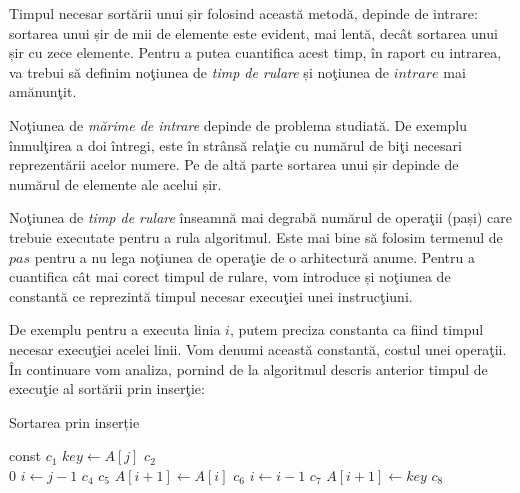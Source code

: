 Timpul necesar sortării unui șir folosind această metodă, depinde de intrare: sortarea unui șir de mii de elemente este evident, mai lentă, decât sortarea unui șir cu zece elemente. Pentru a putea cuantifica acest timp, în raport cu intrarea, va trebui să definim noţiunea de \textit{timp de rulare} și noţiunea de $intrare$ mai amănunţit.

Noţiunea de \textit{mărime de intrare} depinde de problema studiată. De exemplu înmulţirea a doi întregi, este în strânsă relaţie cu numărul de biţi necesari reprezentării acelor numere. Pe de altă parte sortarea unui șir depinde de numărul de elemente ale acelui șir.

Noţiunea de \textit{timp de rulare} înseamnă mai degrabă numărul de operaţii (pași) care trebuie executate pentru a rula algoritmul. Este mai bine să folosim termenul de $pas$ pentru a nu lega noţiunea de operaţie de o arhitectură anume. Pentru a cuantifica cât mai corect timpul de rulare, vom introduce și noţiunea de constantă ce reprezintă timpul necesar execuţiei unei instrucţiuni.

De exemplu pentru a executa linia $i$, putem preciza constanta ca fiind timpul necesar execuţiei acelei linii. Vom denumi această constantă, costul unei operaţii. În continuare vom analiza, pornind de la algoritmul descris anterior timpul de execuţie al sortării prin inserţie:
\begin{algorithm}
	\caption{Sortarea prin inserție}\label{alg:insertie}
	\begin{algorithmic}[1]
	
	 \hfill const  \tab{}
		  \hfill $c_1$  \tab{}
		\State $key\gets A[j]$ 		 	 \hfill $c_2$  \tab{} \\
		 \hfill $0$  \tab{}
		\State $i \gets j-1$ 			\hfill $c_4$  \tab{}
			\hfill $c_5$   \tab{}
		\State $A[i+1] \gets A[i]$ 				\hfill $c_6$   \tab{}
		\State $i \gets i-1$ 				\hfill $c_7$  		\tab{}
		\EndWhile\label{pseudocodwhile}	
		\State $A[i+1] \gets key$ 				\hfill $c_8$  \tab{}
		\EndFor		
		\EndProcedure
	\end{algorithmic}
\end{algorithm}



